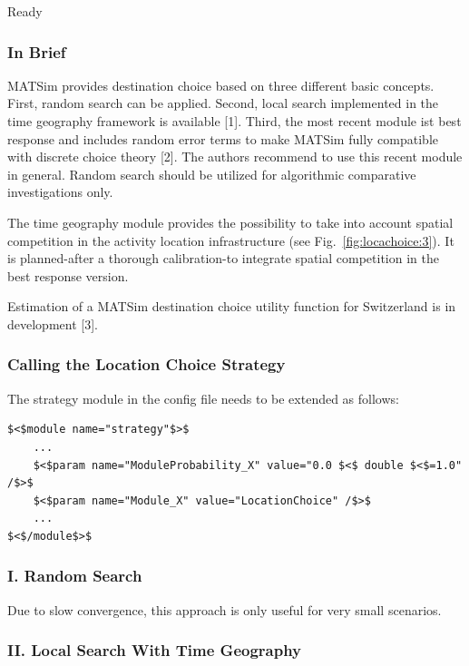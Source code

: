 Ready

\subsubsection{{In Brief}}

MATSim provides destination choice based on three  different basic concepts. First, random search can be applied. Second,  local search implemented in the time geography framework is available  [1]. Third, the most recent module ist best response and includes random  error terms to make MATSim fully compatible with discrete choice theory  [2]. The authors recommend to use this recent module in general. Random  search should be utilized for algorithmic comparative investigations  only.

The time geography module provides the possibility to  take into account spatial competition in the activity location  infrastructure (see Fig.~\ref{fig:locachoice:3}). It is planned-after a thorough calibration-to integrate spatial competition in the best response version.

Estimation of a MATSim destination choice utility function for Switzerland is in development [3].




\subsubsection{{Calling the Location Choice Strategy}}

The strategy module in the config file needs to be extended as follows:
\begin{verbatim}
$<$module name="strategy"$>$
    ...
    $<$param name="ModuleProbability_X" value="0.0 $<$ double $<$=1.0" /$>$
    $<$param name="Module_X" value="LocationChoice" /$>$
    ...
$<$/module$>$
\end{verbatim}


\subsubsection{{I. Random Search}}

Due to slow convergence, this approach is only useful for very small scenarios.


\subsubsection{{II. Local Search With Time Geography}}

